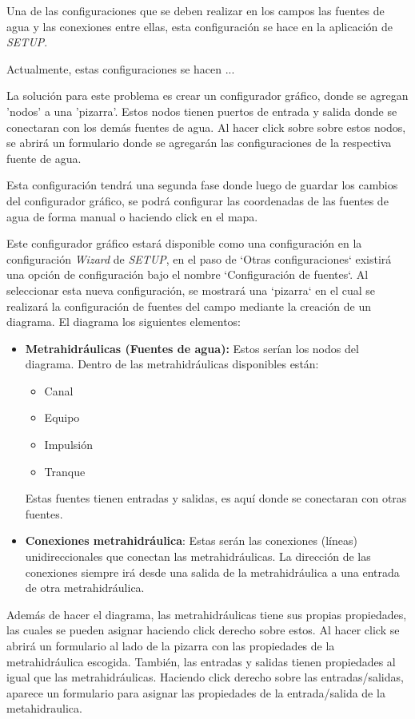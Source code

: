 Una de las configuraciones que se deben realizar en los campos las fuentes de agua y las conexiones entre ellas, esta configuración se hace en la aplicación de \textit{SETUP}.

Actualmente, estas configuraciones se hacen ...

La solución para este problema es crear un configurador gráfico, donde se agregan 'nodos' a una 'pizarra'. Estos nodos tienen puertos de entrada y salida donde se conectaran con los demás fuentes de agua. Al hacer click sobre sobre estos nodos, se abrirá un formulario donde se agregarán las configuraciones de la respectiva fuente de agua.

Esta configuración tendrá una segunda fase donde luego de guardar los cambios del configurador gráfico, se podrá configurar las coordenadas de las fuentes de agua de forma manual o haciendo click en el mapa.

Este configurador gráfico estará disponible como una configuración en la configuración \textit{Wizard} de \textit{SETUP}, en el paso de `Otras configuraciones` existirá una opción de configuración bajo el nombre `Configuración de fuentes`.
Al seleccionar esta nueva configuración, se mostrará una `pizarra` en el cual se realizará la configuración de fuentes del campo mediante la creación de un diagrama. El diagrama los siguientes elementos:
\begin{itemize}
    \item \textbf{Metrahidráulicas (Fuentes de agua):} Estos serían los nodos del diagrama. Dentro de las metrahidráulicas disponibles están:
          \begin{itemize}
              \item Canal
              \item Equipo
              \item Impulsión
              \item Tranque
          \end{itemize}
    Estas fuentes tienen entradas y salidas, es aquí donde se conectaran con otras fuentes.
    \item \textbf{Conexiones metrahidráulica}: Estas serán las conexiones (líneas) unidireccionales que conectan las metrahidráulicas. La dirección de las conexiones siempre irá desde una salida de la metrahidráulica a una entrada de otra metrahidráulica.
\end{itemize}

Además de hacer el diagrama, las metrahidráulicas tiene sus propias propiedades, las cuales se pueden asignar haciendo click derecho sobre estos. Al hacer click se abrirá un formulario al lado de la pizarra con las propiedades de la metrahidráulica escogida.
También, las entradas y salidas tienen propiedades al igual que las metrahidráulicas. Haciendo click derecho sobre las entradas/salidas, aparece un formulario para asignar las propiedades de la entrada/salida de la metahidraulica.

